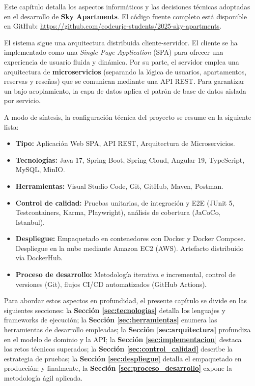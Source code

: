 Este capítulo detalla los aspectos informáticos y las decisiones técnicas adoptadas en el desarrollo de \textbf{Sky Apartments}. El código fuente completo está disponible en GitHub:
\newline
\url{https://github.com/codeurjc-students/2025-sky-apartments}.

El sistema sigue una arquitectura distribuida cliente-servidor. El cliente se ha implementado como una \textit{Single Page Application} (SPA) para ofrecer una experiencia de usuario fluida y dinámica. Por su parte, el servidor emplea una arquitectura de \textbf{microservicios} (separando la lógica de usuarios, apartamentos, reservas y reseñas) que se comunican mediante una API REST. Para garantizar un bajo acoplamiento, la capa de datos aplica el patrón de base de datos aislada por servicio.

A modo de síntesis, la configuración técnica del proyecto se resume en la siguiente lista:

\begin{itemize}
    \item \textbf{Tipo:} Aplicación Web SPA, API REST, Arquitectura de Microservicios.
    \item \textbf{Tecnologías:} Java 17, Spring Boot, Spring Cloud, Angular 19, TypeScript, MySQL, MinIO.
    \item \textbf{Herramientas:} Visual Studio Code, Git, GitHub, Maven, Postman.
    \item \textbf{Control de calidad:} Pruebas unitarias, de integración y E2E (JUnit 5, Testcontainers, Karma, Playwright), análisis de cobertura (JaCoCo, Istanbul).
    \item \textbf{Despliegue:} Empaquetado en contenedores con Docker y Docker Compose. Despliegue en la nube mediante Amazon EC2 (AWS). Artefacto distribuido vía DockerHub.
    \item \textbf{Proceso de desarrollo:} Metodología iterativa e incremental, control de versiones (Git), flujos CI/CD automatizados (GitHub Actions).
\end{itemize}

Para abordar estos aspectos en profundidad, el presente capítulo se divide en las siguientes secciones: la \textbf{Sección \ref{sec:tecnologias}} detalla los lenguajes y frameworks de ejecución; la \textbf{Sección \ref{sec:herramientas}} enumera las herramientas de desarrollo empleadas; la \textbf{Sección \ref{sec:arquitectura}} profundiza en el modelo de dominio y la API; la \textbf{Sección \ref{sec:implementacion}} destaca los retos técnicos superados; la \textbf{Sección \ref{sec:control_calidad}} describe la estrategia de pruebas; la \textbf{Sección \ref{sec:despliegue}} detalla el empaquetado en producción; y finalmente, la \textbf{Sección \ref{sec:proceso_desarrollo}} expone la metodología ágil aplicada.

